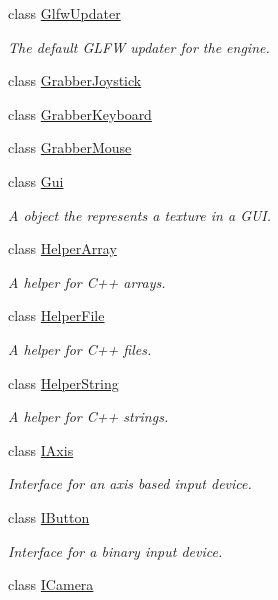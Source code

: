 \begin{DoxyCompactItemize}
class \hyperlink{class_flounder_1_1_glfw_updater}{Glfw\+Updater}
\begin{DoxyCompactList}\small\item\em The default G\+L\+FW updater for the engine. \end{DoxyCompactList}\item 
class \hyperlink{class_flounder_1_1_grabber_joystick}{Grabber\+Joystick}
\item 
class \hyperlink{class_flounder_1_1_grabber_keyboard}{Grabber\+Keyboard}
\item 
class \hyperlink{class_flounder_1_1_grabber_mouse}{Grabber\+Mouse}
\item 
class \hyperlink{class_flounder_1_1_gui}{Gui}
\begin{DoxyCompactList}\small\item\em A object the represents a texture in a G\+UI. \end{DoxyCompactList}\item 
class \hyperlink{class_flounder_1_1_helper_array}{Helper\+Array}
\begin{DoxyCompactList}\small\item\em A helper for C++ arrays. \end{DoxyCompactList}\item 
class \hyperlink{class_flounder_1_1_helper_file}{Helper\+File}
\begin{DoxyCompactList}\small\item\em A helper for C++ files. \end{DoxyCompactList}\item 
class \hyperlink{class_flounder_1_1_helper_string}{Helper\+String}
\begin{DoxyCompactList}\small\item\em A helper for C++ strings. \end{DoxyCompactList}\item 
class \hyperlink{class_flounder_1_1_i_axis}{I\+Axis}
\begin{DoxyCompactList}\small\item\em Interface for an axis based input device. \end{DoxyCompactList}\item 
class \hyperlink{class_flounder_1_1_i_button}{I\+Button}
\begin{DoxyCompactList}\small\item\em Interface for a binary input device. \end{DoxyCompactList}\item 
class \hyperlink{class_flounder_1_1_i_camera}{I\+Camera}

\end{DoxyCompactItemize}
